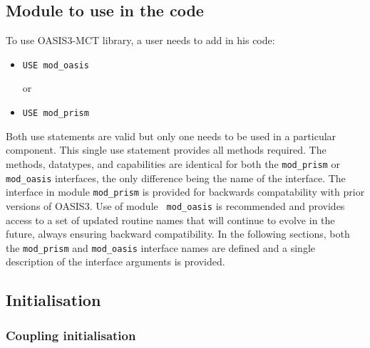 \subsection{Module to use in the code}
\label{subsubsec_Use}

To use OASIS3-MCT library, a user needs to add in his code:

\begin{itemize}

\item {\tt USE mod\_oasis}

  or

\item {\tt USE mod\_prism}
 
\end{itemize}

Both use statements are valid but only one needs to be used in a particular component. This single use statement provides all methods required. The methods, datatypes, and capabilities
are identical for both the {\tt mod\_prism} or {\tt mod\_oasis}
interfaces, the only difference being the name of the interface. The
interface in module {\tt mod\_prism} is provided for backwards
compatability with prior versions of OASIS3. Use of module {\tt
  mod\_oasis} is recommended and provides access to a set of updated
routine names that will continue to evolve in the future, always
ensuring backward compatibility.  In the following sections, both the
{\tt mod\_prism} and {\tt mod\_oasis} interface names are defined and
a single description of the interface arguments is provided.

\subsection{Initialisation}
\label{subsubsec_Initialisation}

\subsubsection{Coupling initialisation}
\label{init_comp}

